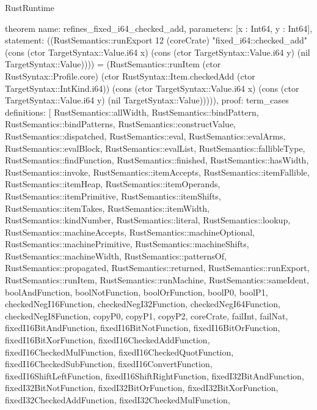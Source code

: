 \begin{lexlean}{RustRuntime}
\begin{semanticmodule}
theorem{
  name: refines_fixed_i64_checked_add,
  parameters: [x : Int64, y : Int64],
  statement: ((RustSemantics::runExport 12 (coreCrate) "fixed_i64::checked_add" (cons (ctor TargetSyntax::Value.i64 x) (cons (ctor TargetSyntax::Value.i64 y) (nil TargetSyntax::Value)))) = (RustSemantics::runItem (ctor RustSyntax::Profile.core) (ctor RustSyntax::Item.checkedAdd (ctor TargetSyntax::IntKind.i64)) (cons (ctor TargetSyntax::Value.i64 x) (cons (ctor TargetSyntax::Value.i64 y) (nil TargetSyntax::Value))))),
  proof: term_cases{
    definitions: [
      RustSemantics::allWidth,
      RustSemantics::bindPattern,
      RustSemantics::bindPatterns,
      RustSemantics::constructValue,
      RustSemantics::dispatched,
      RustSemantics::eval,
      RustSemantics::evalArms,
      RustSemantics::evalBlock,
      RustSemantics::evalList,
      RustSemantics::fallibleType,
      RustSemantics::findFunction,
      RustSemantics::finished,
      RustSemantics::hasWidth,
      RustSemantics::invoke,
      RustSemantics::itemAccepts,
      RustSemantics::itemFallible,
      RustSemantics::itemHeap,
      RustSemantics::itemOperands,
      RustSemantics::itemPrimitive,
      RustSemantics::itemShifts,
      RustSemantics::itemTakes,
      RustSemantics::itemWidth,
      RustSemantics::kindNumber,
      RustSemantics::literal,
      RustSemantics::lookup,
      RustSemantics::machineAccepts,
      RustSemantics::machineOptional,
      RustSemantics::machinePrimitive,
      RustSemantics::machineShifts,
      RustSemantics::machineWidth,
      RustSemantics::patternsOf,
      RustSemantics::propagated,
      RustSemantics::returned,
      RustSemantics::runExport,
      RustSemantics::runItem,
      RustSemantics::runMachine,
      RustSemantics::sameIdent,
      boolAndFunction,
      boolNotFunction,
      boolOrFunction,
      boolP0,
      boolP1,
      checkedNegI16Function,
      checkedNegI32Function,
      checkedNegI64Function,
      checkedNegI8Function,
      copyP0,
      copyP1,
      copyP2,
      coreCrate,
      failInt,
      failNat,
      fixedI16BitAndFunction,
      fixedI16BitNotFunction,
      fixedI16BitOrFunction,
      fixedI16BitXorFunction,
      fixedI16CheckedAddFunction,
      fixedI16CheckedMulFunction,
      fixedI16CheckedQuotFunction,
      fixedI16CheckedSubFunction,
      fixedI16ConvertFunction,
      fixedI16ShiftLeftFunction,
      fixedI16ShiftRightFunction,
      fixedI32BitAndFunction,
      fixedI32BitNotFunction,
      fixedI32BitOrFunction,
      fixedI32BitXorFunction,
      fixedI32CheckedAddFunction,
      fixedI32CheckedMulFunction,
}}
\end{semanticmodule}
\end{lexlean}
